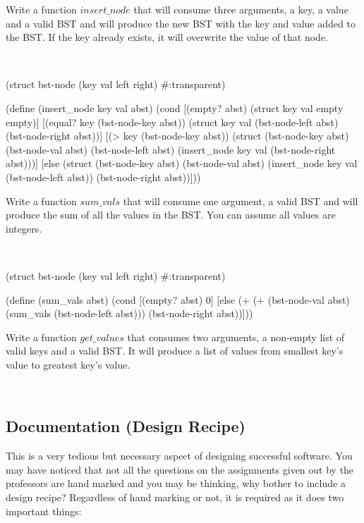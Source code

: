 \documentclass[11pt, twoside, exarticle]{article}
\newcommand{\exbox}[2] {
	\setlength{\fboxsep}{8pt}
	\marginpar {
		\vspace{0.9em}
		\footnotesize{\textbf{\color{darkpurple}EXAMPLE #1}}
	}
	\colorbox{lightpurple}{
		\begin{varwidth}{\dimexpr\linewidth-2\fboxsep}
		#2
		\end{varwidth}
	}
	~\\
}
\newcommand{\exerbox}[1] {
	\setlength{\fboxsep}{8pt}
	\marginpar {
		\vspace{0.9em}
		\footnotesize{\textbf{\color{darkred}EXERCISE}}
	}
	\colorbox{lightred}{
		\begin{varwidth}{\dimexpr\linewidth-2\fboxsep}
		#1
		\end{varwidth}
	}
	~\\
}
\begin{document}
\exbox{2}{Write a function $insert\_node$ that will consume three arguments, a key, a value and a valid BST and will produce the new BST with the key and value added to the BST. If the key already exists, it will overwrite the value of that node.}

\begin{code}[Lisp]
(struct bst-node (key val left right) #:transparent)

(define (insert_node key val abst)
	(cond
		[(empty? abst) (struct key val empty empty)]
		[(equal? key (bst-node-key abst)) (struct key val 
		                                          (bst-node-left abst)
		                                          (bst-node-right abst))]
		[(> key (bst-node-key abst)) (struct (bst-node-key abst)
		                                     (bst-node-val abst)
		                                     (bst-node-left abst)
		                                     (insert_node key val 
		                                                  (bst-node-right abst)))]
		[else (struct (bst-node-key abst)
		              (bst-node-val abst)
		              (insert_node key val (bst-node-left abst))
		              (bst-node-right abst))]))
\end{code}

\exbox{3}{Write a function $sum\_vals$ that will consume one argument, a valid BST and will produce the sum of all the values in the BST. You can assume all values are integers.}

\begin{code}[Lisp]
(struct bst-node (key val left right) #:transparent)

(define (sum_vals abst)
	(cond
		[(empty? abst) 0]
		[else (+ (+ (bst-node-val abst) (sum_vals (bst-node-left abst))) 
		         (bst-node-right abst))]))
\end{code}

\exerbox{Write a function $get\_values$ that consumes two arguments, a non-empty list of valid keys and a valid BST. It will produce a list of values from smallest key's value to greatest key's value.}

\clearpage
\subsection{Documentation (Design Recipe)}

This is a very tedious but necessary aspect of designing successful software. You may have noticed that not all the questions on the assignments given out by the professors are hand marked and you may be thinking, why bother to include a design recipe? Regardless of hand marking or not, it is required as it does two important things:
\end{document}
